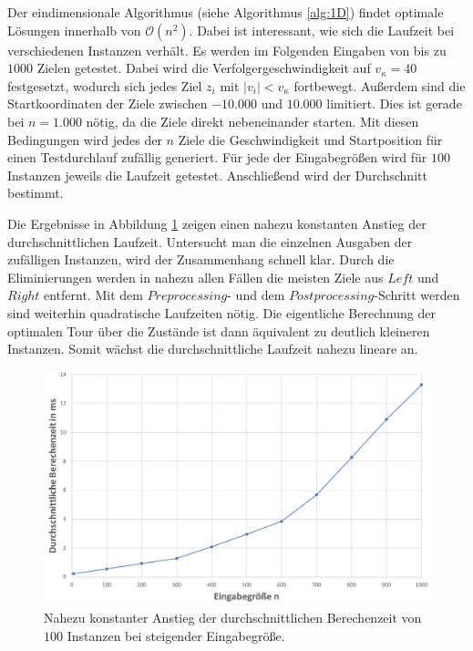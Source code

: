 \documentclass[german,version-2019-11]{uzl-thesis}
\begin{document}
Der eindimensionale Algorithmus (siehe Algorithmus \ref{alg:1D}) findet optimale Lösungen innerhalb von $\mathcal{O}(n^2)$. Dabei ist interessant, wie sich die Laufzeit bei verschiedenen Instanzen verhält. Es werden im Folgenden Eingaben von bis zu $1000$ Zielen getestet. Dabei wird die Verfolgergeschwindigkeit auf $v_\kappa=40$ festgesetzt, wodurch sich jedes Ziel $z_i$ mit $|v_i|<v_\kappa$ fortbewegt. Außerdem sind die Startkoordinaten der Ziele zwischen $-10.000$ und $10.000$ limitiert. Dies ist gerade bei $n=1.000$ nötig, da die Ziele direkt nebeneinander starten. Mit diesen Bedingungen wird jedes der $n$ Ziele die Geschwindigkeit und Startposition für einen Testdurchlauf zufällig generiert. Für jede der Eingabegrößen wird für $100$ Instanzen jeweils die Laufzeit getestet. Anschließend wird der Durchschnitt bestimmt. 

Die Ergebnisse in Abbildung \ref{fig:Exp1D} zeigen einen nahezu konstanten Anstieg der durchschnittlichen Laufzeit. Untersucht man die einzelnen Ausgaben der zufälligen Instanzen, wird der Zusammenhang schnell klar. Durch die Eliminierungen werden in nahezu allen Fällen die meisten Ziele aus $Left$ und $Right$ entfernt. Mit dem $Preprocessing$- und dem $Postprocessing$-Schritt werden sind weiterhin quadratische Laufzeiten nötig. Die eigentliche Berechnung der optimalen Tour über die Zustände ist dann äquivalent zu deutlich kleineren Instanzen. Somit wächst die durchschnittliche Laufzeit nahezu lineare an. 

\newpage
\begin{figure}[htpb]
\centering
\includegraphics[scale=0.24]{../Grafiken/Verwendete/Exp1D_2.png}
\caption{Nahezu konstanter Anstieg der durchschnittlichen Berechenzeit von $100$ Instanzen bei steigender Eingabegröße.}
\label{fig:Exp1D}
\end{figure} 
\newpage
\end{document}
